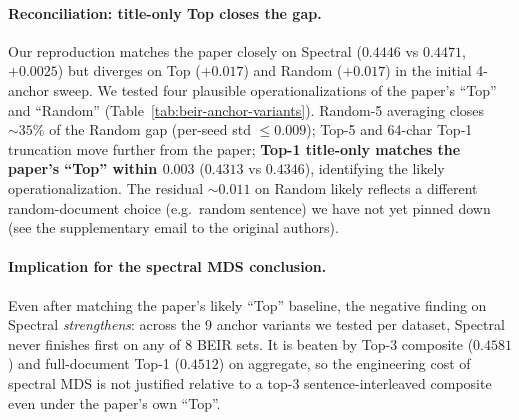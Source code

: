 \documentclass[sigconf]{acmart}
\begin{document}
\paragraph{Reconciliation: title-only Top closes the gap.}
Our reproduction matches the paper closely on Spectral
($0.4446$ vs $0.4471$, $+0.0025$) but diverges on Top ($+0.017$)
and Random ($+0.017$) in the initial 4-anchor sweep. We tested
four plausible operationalizations of the paper's ``Top'' and
``Random'' (Table~\ref{tab:beir-anchor-variants}). Random-5
averaging closes $\sim 35\%$ of the Random gap (per-seed std
$\leq 0.009$); Top-5 and 64-char Top-1 truncation move further
from the paper; \textbf{Top-1 title-only matches the paper's
``Top'' within $0.003$} ($0.4313$ vs $0.4346$), identifying the
likely operationalization. The residual $\sim 0.011$ on Random
likely reflects a different random-document choice (e.g.\ random
sentence) we have not yet pinned down (see the supplementary
email to the original authors).

\paragraph{Implication for the spectral MDS conclusion.} Even
after matching the paper's likely ``Top'' baseline, the negative
finding on Spectral \emph{strengthens}: across the 9 anchor
variants we tested per dataset, Spectral never finishes first on
any of 8 BEIR sets. It is beaten by Top-3 composite ($0.4581$) and
full-document Top-1 ($0.4512$) on aggregate, so the engineering
cost of spectral MDS is not justified relative to a top-3
sentence-interleaved composite even under the paper's own ``Top''.
\end{document}

